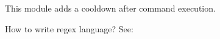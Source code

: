 \label{ch:command_cooldown}

This module adds a cooldown after command execution.

\begin{tips}{How to write regex language?}
    See:~
\end{tips}
